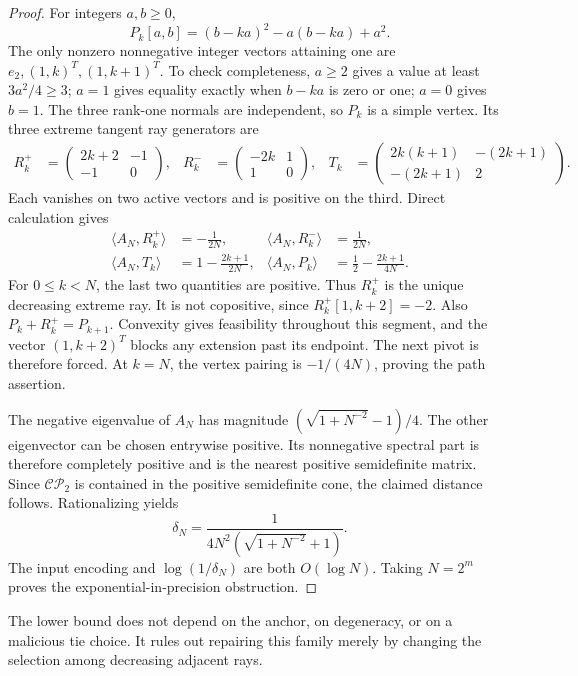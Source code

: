 \documentclass[11pt]{article}
\theoremstyle{remark}\newtheorem{remark}[theorem]{Remark}
\newcommand{\CP}{\mathcal{CP}}
\newcommand{\ip}[2]{\langle #1,#2\rangle}
\begin{document}
\begin{proof}
For integers $a,b\ge0$,
\[
 P_k[a,b]=(b-ka)^2-a(b-ka)+a^2.
\]
The only nonzero nonnegative integer vectors attaining one are
$e_2,(1,k)^T,(1,k+1)^T$. To check completeness, $a\ge2$ gives a value at least $3a^2/4\ge3$; $a=1$ gives equality exactly when $b-ka$ is zero or one; $a=0$ gives $b=1$. The three rank-one normals are independent, so $P_k$ is a simple vertex. Its three extreme tangent ray generators are
\begin{align*}
 R_k^+&=\begin{pmatrix}2k+2&-1\\-1&0\end{pmatrix},&
 R_k^-&=\begin{pmatrix}-2k&1\\1&0\end{pmatrix},&
 T_k&=\begin{pmatrix}2k(k+1)&-(2k+1)\\-(2k+1)&2\end{pmatrix}.
\end{align*}
Each vanishes on two active vectors and is positive on the third. Direct calculation gives
\begin{align*}
 \ip{A_N}{R_k^+}&=-\frac1{2N},&
 \ip{A_N}{R_k^-}&=\frac1{2N},\\
 \ip{A_N}{T_k}&=1-\frac{2k+1}{2N},&
 \ip{A_N}{P_k}&=\frac12-\frac{2k+1}{4N}.
\end{align*}
For $0\le k<N$, the last two quantities are positive. Thus $R_k^+$ is the unique decreasing extreme ray. It is not copositive, since $R_k^+[1,k+2]=-2$. Also $P_k+R_k^+=P_{k+1}$. Convexity gives feasibility throughout this segment, and the vector $(1,k+2)^T$ blocks any extension past its endpoint. The next pivot is therefore forced. At $k=N$, the vertex pairing is $-1/(4N)$, proving the path assertion.

The negative eigenvalue of $A_N$ has magnitude $(\sqrt{1+N^{-2}}-1)/4$. The other eigenvector can be chosen entrywise positive. Its nonnegative spectral part is therefore completely positive and is the nearest positive semidefinite matrix. Since $\CP_2$ is contained in the positive semidefinite cone, the claimed distance follows. Rationalizing yields
\[
 \delta_N=\frac1{4N^2(\sqrt{1+N^{-2}}+1)}.
\]
The input encoding and $\log(1/\delta_N)$ are both $O(\log N)$. Taking $N=2^m$ proves the exponential-in-precision obstruction.
\end{proof}

The lower bound does not depend on the anchor, on degeneracy, or on a malicious tie choice. It rules out repairing this family merely by changing the selection among decreasing adjacent rays.
\end{document}
